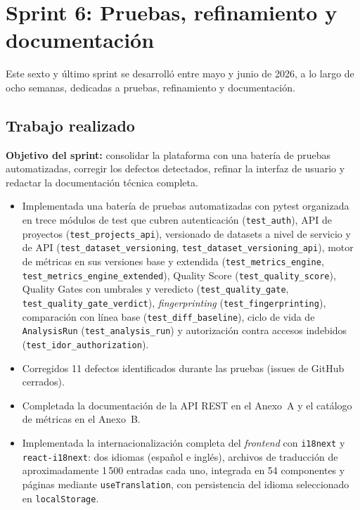 \section{Sprint 6: Pruebas, refinamiento y documentación}
\label{sec:sprint6}
Este sexto y último sprint se desarrolló entre mayo y junio de 2026, a lo largo
de ocho semanas, dedicadas a pruebas, refinamiento y documentación.

\subsection{Trabajo realizado}

\textbf{Objetivo del sprint:} consolidar la plataforma con una batería de
pruebas automatizadas, corregir los defectos detectados, refinar la interfaz
de usuario y redactar la documentación técnica completa.

\begin{itemize}
  \item Implementada una batería de pruebas automatizadas con pytest
    organizada en trece módulos de test que cubren autenticación
    (\texttt{test\_auth}), \ac{API} de proyectos (\texttt{test\_projects\_api}),
    versionado de datasets a nivel de servicio y de \ac{API}
    (\texttt{test\_dataset\_versioning},
    \texttt{test\_dataset\_versioning\_api}), motor de métricas en sus
    versiones base y extendida (\texttt{test\_metrics\_engine},
    \texttt{test\_metrics\_engine\_extended}), Quality Score
    (\texttt{test\_quality\_score}), Quality Gates con umbrales y
    veredicto (\texttt{test\_quality\_gate},
    \texttt{test\_quality\_gate\_verdict}), \emph{fingerprinting}
    (\texttt{test\_fingerprinting}), comparación con línea base
    (\texttt{test\_diff\_baseline}), ciclo de vida de \texttt{AnalysisRun}
    (\texttt{test\_analysis\_run}) y autorización contra accesos
    indebidos (\texttt{test\_idor\_authorization}).
  \item Corregidos 11 defectos identificados durante las pruebas (issues de
    GitHub cerrados).
  \item Completada la documentación de la \ac{API} \ac{REST} en el Anexo~A
    y el catálogo de métricas en el Anexo~B.
  \item Implementada la internacionalización completa del \emph{frontend}
    con \texttt{i18next} y \texttt{react-i18next}: dos idiomas (español e
    inglés), archivos de traducción de aproximadamente 1\,500 entradas cada
    uno, integrada en 54 componentes y páginas mediante \texttt{useTranslation},
    con persistencia del idioma seleccionado en \texttt{localStorage}.
\end{itemize}

